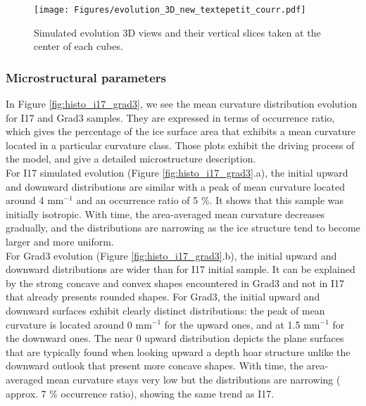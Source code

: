 \documentclass[draft,ms]{agujournal2019}
\begin{document}
\begin{figure}
    \centering
    \texttt{[image: Figures/evolution\_3D\_new\_textepetit\_courr.pdf]}
    \caption{Simulated evolution 3D views and their vertical slices taken at the center of each cubes.}
    \label{fig:evolutions_3D}
\end{figure}
\subsubsection{Microstructural parameters}

In Figure \ref{fig:histo_i17_grad3}, we see the mean curvature distribution evolution for I17 and Grad3 samples. They are expressed in terms of occurrence ratio, which gives the percentage of the ice surface area that exhibits a mean curvature located in a particular curvature class. Those plots exhibit the driving process of the model, and give a detailed microstructure description.\\
For I17 simulated evolution (Figure \ref{fig:histo_i17_grad3}.a), the initial upward and downward distributions are similar with a peak of mean curvature located around 4 mm$^{-1}$ and an occurrence ratio of 5 \%. It shows that this sample was initially isotropic. With time, the area-averaged mean curvature decreases gradually, and the distributions are narrowing as the ice structure tend to become larger and more uniform.\\
For Grad3 evolution (Figure \ref{fig:histo_i17_grad3}.b), the initial upward and downward distributions are wider than for I17 initial sample. It can be explained by the strong concave and convex shapes encountered in Grad3 and not in I17 that already presents rounded shapes. For Grad3, the initial upward and downward surfaces exhibit clearly distinct distributions: the peak of mean curvature is located around 0 mm$^{-1}$ for the upward ones, and at 1.5 mm$^{-1}$ for the downward ones. The near 0 upward distribution depicts the plane surfaces that are typically found when looking upward a depth hoar structure unlike the downward outlook that present more concave shapes. With time, the area-averaged mean curvature stays very low but the distributions are narrowing ( approx. 7 \% occurrence ratio), showing the same trend as I17.\\
\end{document}
